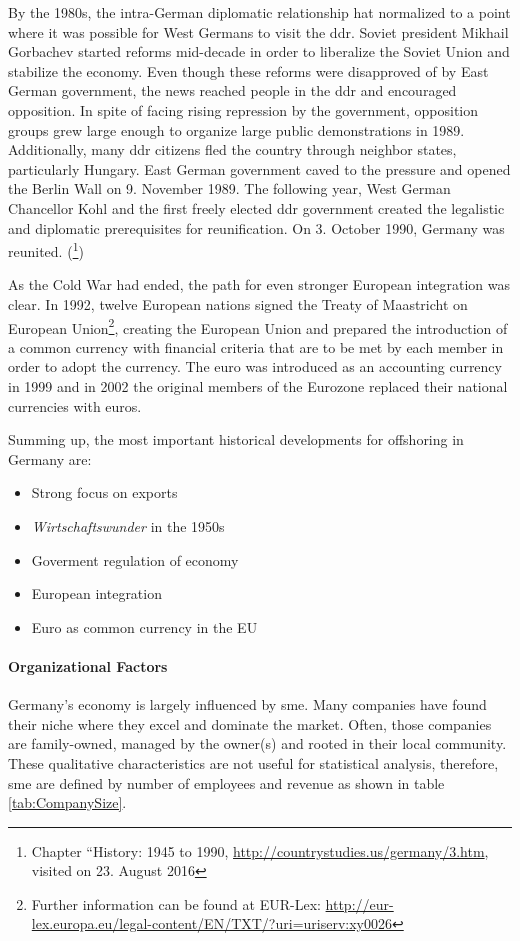 By the 1980s, the intra-German diplomatic relationship hat normalized to a point where it was possible for West Germans to visit the \gls{ddr}. Soviet president Mikhail Gorbachev started reforms  mid-decade in order to liberalize the Soviet Union and stabilize the economy. Even though these reforms were disapproved of by East German government, the news reached people in the \gls{ddr} and encouraged opposition. In spite of facing rising repression by the government, opposition groups grew large enough to organize large public demonstrations in 1989. Additionally, many \gls{ddr} citizens fled the country through neighbor states, particularly Hungary. East German government caved to the pressure and opened the Berlin Wall on 9. November 1989. The following year, West German Chancellor Kohl and the first freely elected \gls{ddr} government created the legalistic and diplomatic prerequisites for reunification. On 3. October 1990, Germany was reunited.
(\cite{Solsten.1995}\footnote{Chapter ``History: 1945 to 1990, \url{http://countrystudies.us/germany/3.htm}, visited on 23. August 2016})

As the Cold War had ended, the path for even stronger European integration was clear. In 1992, twelve European nations signed the Treaty of Maastricht on European Union\footnote{Further information can be found at EUR-Lex: \url{http://eur-lex.europa.eu/legal-content/EN/TXT/?uri=uriserv:xy0026}}, creating the European Union and prepared the introduction of a common currency with financial criteria that are to be met by each member in order to adopt the currency. The euro was introduced as an accounting currency in 1999 and in 2002 the original members of the Eurozone replaced their national currencies with euros.

Summing up, the most important historical developments for offshoring in Germany are:
\begin{itemize}
	\item Strong focus on exports
	\item \textit{Wirtschaftswunder} in the 1950s
	\item Goverment regulation of economy
	\item European integration
	\item Euro as common currency in the EU
\end{itemize}

\newpage %

\paragraph{Organizational Factors}
Germany's economy is largely influenced by \gls{sme}. Many companies have found their niche where they excel and dominate the market. Often, those companies are family-owned, managed by the owner(s) and rooted in their local community. These qualitative characteristics are not useful for statistical analysis, therefore, \gls{sme} are defined by number of employees and revenue as shown in table \ref{tab:CompanySize}.


